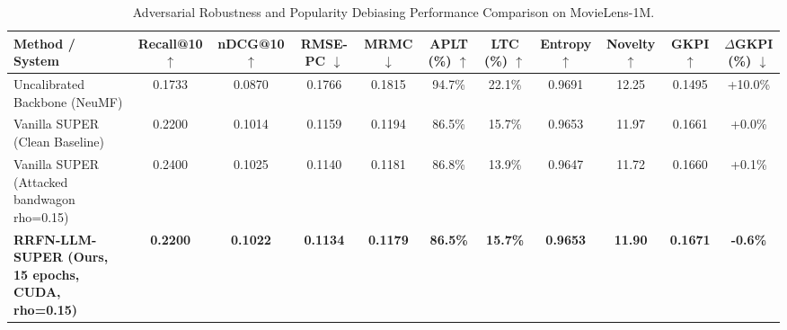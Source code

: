 \begin{table}[t]
\centering
\small
\caption{Adversarial Robustness and Popularity Debiasing Performance Comparison on MovieLens-1M.}
\label{tab:benchmark_results}
\begin{tabular}{lcccccccccc}
\toprule
\textbf{Method / System} & \textbf{Recall@10} $\uparrow$ & \textbf{nDCG@10} $\uparrow$ & \textbf{RMSE-PC} $\downarrow$ & \textbf{MRMC} $\downarrow$ & \textbf{APLT} (\%) $\uparrow$ & \textbf{LTC} (\%) $\uparrow$ & \textbf{Entropy} $\uparrow$ & \textbf{Novelty} $\uparrow$ & \textbf{GKPI} $\uparrow$ & \textbf{$\Delta$GKPI} (\%) $\downarrow$ \\
\midrule
Uncalibrated Backbone (NeuMF) & 0.1733 & 0.0870 & 0.1766 & 0.1815 & 94.7\% & 22.1\% & 0.9691 & 12.25 & 0.1495 & +10.0\% \\
Vanilla SUPER (Clean Baseline) & 0.2200 & 0.1014 & 0.1159 & 0.1194 & 86.5\% & 15.7\% & 0.9653 & 11.97 & 0.1661 & +0.0\% \\
Vanilla SUPER (Attacked bandwagon rho=0.15) & 0.2400 & 0.1025 & 0.1140 & 0.1181 & 86.8\% & 13.9\% & 0.9647 & 11.72 & 0.1660 & +0.1\% \\
\textbf{RRFN-LLM-SUPER (Ours, 15 epochs, CUDA, rho=0.15)} & \textbf{0.2200} & \textbf{0.1022} & \textbf{0.1134} & \textbf{0.1179} & \textbf{86.5\%} & \textbf{15.7\%} & \textbf{0.9653} & \textbf{11.90} & \textbf{0.1671} & \textbf{-0.6\%} \\
\bottomrule
\end{tabular}
\end{table}